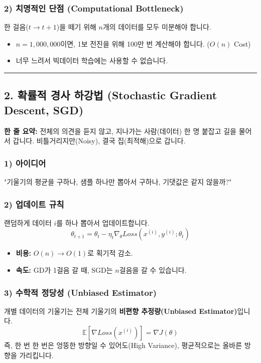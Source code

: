 \documentclass[11pt,a4paper]{book}
\theoremstyle{definition}
\begin{document}
\subsubsection*{2) 치명적인 단점 (Computational Bottleneck)}
한 걸음($t \to t+1$)을 떼기 위해 $n$개의 데이터를 모두 미분해야 합니다.
\begin{itemize}
    \item $n=1,000,000$이면, 1보 전진을 위해 100만 번 계산해야 합니다. ($O(n)$ Cost)
    \item 너무 느려서 빅데이터 학습에는 사용할 수 없습니다.
\end{itemize}

\vspace{0.5cm}\hrule\vspace{0.5cm}

\subsection{2. 확률적 경사 하강법 (Stochastic Gradient Descent, SGD)}

\begin{conceptbox}[title={개념 2: 술 취한 사람의 귀가}]
\textbf{한 줄 요약:} 전체의 의견을 듣지 않고, 지나가는 사람(데이터) 한 명 붙잡고 길을 물어서 갑니다. 비틀거리지만(Noisy), 결국 집(최적해)으로 갑니다.
\end{conceptbox}

\subsubsection*{1) 아이디어}
"기울기의 평균을 구하나, 샘플 하나만 뽑아서 구하나, 기댓값은 같지 않을까?"

\subsubsection*{2) 업데이트 규칙}
랜덤하게 데이터 $i$를 하나 뽑아서 업데이트합니다.
$$ \theta_{t+1} = \theta_t - \eta_t \nabla_\theta Loss(x^{(i)}, y^{(i)}; \theta_t) $$
\begin{itemize}
    \item \textbf{비용:} $O(n) \to O(1)$로 획기적 감소.
    \item \textbf{속도:} GD가 1걸음 갈 때, SGD는 $n$걸음을 갈 수 있습니다.
\end{itemize}

\subsubsection*{3) 수학적 정당성 (Unbiased Estimator)}
개별 데이터의 기울기는 전체 기울기의 \textbf{비편향 추정량(Unbiased Estimator)}입니다.
$$ \mathbb{E}[\nabla Loss(x^{(i)})] = \nabla J(\theta) $$
즉, 한 번 한 번은 엉뚱한 방향일 수 있어도(High Variance), 평균적으로는 올바른 방향을 가리킵니다.
\end{document}
